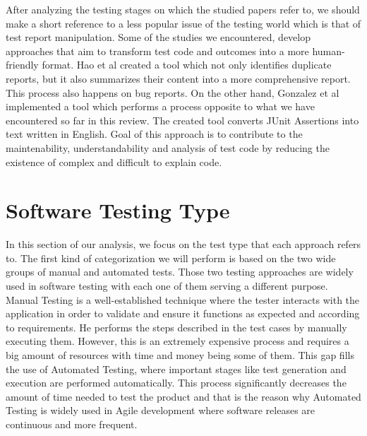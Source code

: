 After analyzing the testing stages on which the studied papers refer to, we should make a short reference to a less popular issue of the testing world which is that of test report manipulation. Some of the studies 
we encountered, develop approaches that aim to transform test code and outcomes into a more human-friendly format. Hao et al \cite{8811987} created a tool which not only identifies duplicate reports, but it also 
summarizes their content into a more comprehensive report. This process also happens on bug reports. On the other hand, Gonzalez et al \cite{10.1145/3283812.3283819} implemented a tool which performs a process 
opposite to what we have encountered so far in this review. The created tool converts JUnit Assertions into text written in English. Goal of this approach is to contribute to the maintenability, understandability 
and analysis of test code by reducing the existence of complex and difficult to explain code.

\section {Software Testing Type}
In this section of our analysis, we focus on the test type that each approach refers to. The first kind of categorization we will perform is based on the two wide groups of manual and automated tests. 
Those two testing approaches are widely used in software testing with each one of them serving a different purpose. Manual Testing is a well-established technique where the tester interacts with the 
application in order to validate and ensure it functions as expected and according to requirements. He performs the steps described in the test cases by manually executing them. However, this is an 
extremely expensive process and requires a big amount of resources with time and money being some of them. This gap fills the use of Automated Testing, where important stages like test generation and execution 
are performed automatically. This process significantly decreases the amount of time needed to test the product and that is the reason why Automated Testing is widely used in Agile development where 
software releases are continuous and more frequent.\\

